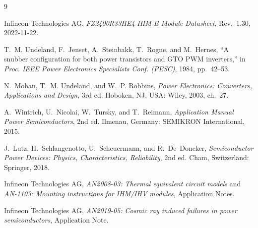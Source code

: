 \documentclass[11pt,a4paper]{article}
\begin{document}
\begin{thebibliography}{9}

Infineon Technologies AG,
\emph{FZ2400R33HE4 IHM-B Module Datasheet},
Rev.~1.30, 2022-11-22.

T.~M. Undeland, F.~Jenset, A.~Steinbakk, T.~Rogne, and M.~Hernes,
``A snubber configuration for both power transistors and GTO PWM inverters,''
in \emph{Proc. IEEE Power Electronics Specialists Conf. (PESC)},
1984, pp.~42--53.

N.~Mohan, T.~M. Undeland, and W.~P. Robbins,
\emph{Power Electronics: Converters, Applications and Design},
3rd ed. Hoboken, NJ, USA: Wiley, 2003, ch.~27.

A.~Wintrich, U.~Nicolai, W.~Tursky, and T.~Reimann,
\emph{Application Manual Power Semiconductors},
2nd ed. Ilmenau, Germany: SEMIKRON International, 2015.

J.~Lutz, H.~Schlangenotto, U.~Scheuermann, and R.~De~Doncker,
\emph{Semiconductor Power Devices: Physics, Characteristics, Reliability},
2nd ed. Cham, Switzerland: Springer, 2018.

Infineon Technologies AG,
\emph{AN2008-03: Thermal equivalent circuit models} and
\emph{AN-1103: Mounting instructions for IHM/IHV modules},
Application Notes.

Infineon Technologies AG,
\emph{AN2019-05: Cosmic ray induced failures in power semiconductors},
Application Note.

\end{thebibliography}
\end{document}
